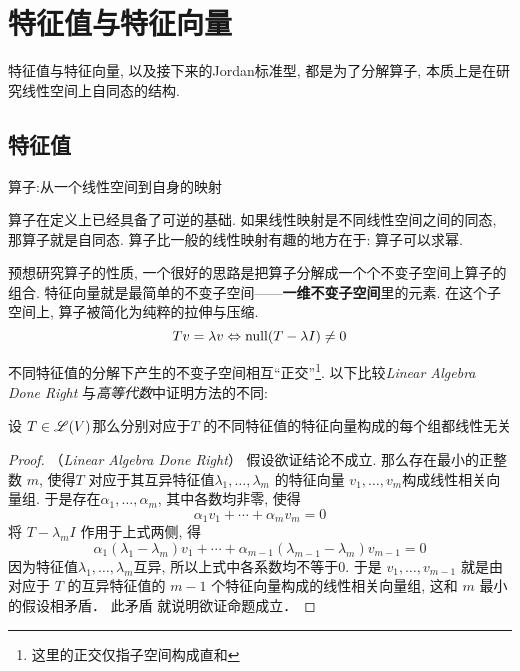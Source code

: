 \chapter{特征值与特征向量}
特征值与特征向量, 以及接下来的Jordan标准型, 都是为了分解算子, 本质上是在研究线性空间上自同态的结构.

\section{特征值}
\begin{definition}
    算子:从一个线性空间到自身的映射
\end{definition}

算子在定义上已经具备了可逆的基础. 如果线性映射是不同线性空间之间的同态, 那算子就是自同态.
算子比一般的线性映射有趣的地方在于: 算子可以求幂.

预想研究算子的性质, 一个很好的思路是把算子分解成一个个不变子空间上算子的组合.
特征向量就是最简单的不变子空间——\textbf{一维不变子空间}里的元素. 在这个子空间上, 算子被简化为纯粹的拉伸与压缩.
\[
    Tv=\lambda v \Leftrightarrow \operatorname{null}(T-\lambda I)\neq {0}
\]

不同特征值的分解下产生的不变子空间相互``正交''\footnote{这里的正交仅指子空间构成直和}.
以下比较\textit{Linear Algebra Done Right} 与\textit{高等代数}中证明方法的不同:

\begin{theorem}
    设 \(T \in \mathscr{L}(V)\)那么分别对应于\(T\) 的不同特征值的特征向量构成的每个组都线性无关
\end{theorem}

\begin{proof}
    （\textit{Linear Algebra Done Right}）
    假设欲证结论不成立. 那么存在最小的正整数 \(m\),  使得\(T\)
    对应于其互异特征值\(\lambda_1, \dots ,\lambda_{m}\)
    的特征向量 \(v_1, \dots, v_m\)构成线性相关向量组.
    于是存在\(\alpha_1, \dots ,\alpha_{m}\), 其中各数均非零, 使得
    \[\alpha_1 v_1 + \cdots + \alpha_m v_m = 0\]
    将 \(T-\lambda_{m}I\) 作用于上式两侧, 得
    \[
        \alpha_1 (\lambda_1 - \lambda_m)v_1 + \cdots +
        \alpha_{m-1} (\lambda_{m-1} - \lambda_m)v_{m-1} = 0
    \]
    因为特征值\(\lambda_1,\dots ,\lambda_{m}\)互异, 所以上式中各系数均不等于0.
    于是 \(v_1, \dots , v_{m-1}\) 就是由对应于 \(T\)
    的互异特征值的 \(m- 1\) 个特征向量构成的线性相关向量组, 这和 \(m\) 最小的假设相矛盾． 此矛盾
    就说明欲证命题成立．
\end{proof}

